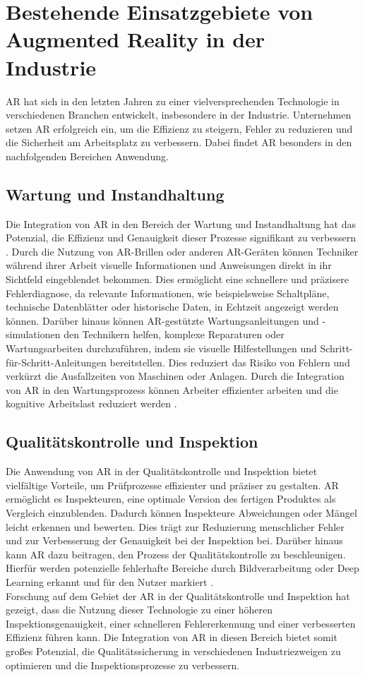 \section{Bestehende Einsatzgebiete von Augmented Reality in der Industrie}

AR hat sich in den letzten Jahren zu einer vielversprechenden Technologie in
verschiedenen Branchen entwickelt, insbesondere in der Industrie. Unternehmen
setzen AR erfolgreich ein, um die Effizienz zu steigern, Fehler zu reduzieren
und die Sicherheit am Arbeitsplatz zu verbessern. Dabei findet AR besonders in
den nachfolgenden Bereichen Anwendung.

\subsection{Wartung und Instandhaltung}
Die Integration von AR in den Bereich der Wartung und Instandhaltung hat das
Potenzial, die Effizienz und Genauigkeit dieser Prozesse signifikant zu
verbessern \cite{liu2022probing}. Durch die Nutzung von AR-Brillen oder anderen
AR-Geräten können Techniker während ihrer Arbeit visuelle Informationen und
Anweisungen direkt in ihr Sichtfeld eingeblendet bekommen. Dies ermöglicht eine
schnellere und präzisere Fehlerdiagnose, da relevante Informationen, wie
beispielsweise Schaltpläne, technische Datenblätter oder historische Daten, in
Echtzeit angezeigt werden können. Darüber hinaus können AR-gestützte
Wartungsanleitungen und -simulationen den Technikern helfen, komplexe
Reparaturen oder Wartungsarbeiten durchzuführen, indem sie visuelle
Hilfestellungen und Schritt-für-Schritt-Anleitungen bereitstellen.
\cite{4079262} Dies reduziert das Risiko von Fehlern und verkürzt die
Ausfallzeiten von Maschinen oder Anlagen. Durch die Integration von AR in den
Wartungsprozess können Arbeiter effizienter arbeiten und die kognitive
Arbeitslast reduziert werden \cite{5620905}.

\subsection{Qualitätskontrolle und Inspektion}
Die Anwendung von AR in der Qualitätskontrolle und Inspektion bietet
vielfältige Vorteile, um Prüfprozesse effizienter und präziser zu gestalten. AR
ermöglicht es Inspekteuren, eine optimale Version des fertigen Produktes als
Vergleich einzublenden. Dadurch können Inspekteure Abweichungen oder Mängel
leicht erkennen und bewerten. Dies trägt zur Reduzierung menschlicher Fehler
und zur Verbesserung der Genauigkeit bei der Inspektion bei. Darüber hinaus
kann AR dazu beitragen, den Prozess der Qualitätskontrolle zu beschleunigen.
Hierfür werden potenzielle fehlerhafte Bereiche durch Bildverarbeitung oder
Deep Learning erkannt und für den Nutzer markiert \cite{9112336}. \\Forschung
auf dem Gebiet der AR in der Qualitätskontrolle und Inspektion hat gezeigt,
dass die Nutzung dieser Technologie zu einer höheren Inspektionsgenauigkeit,
einer schnelleren Fehlererkennung und einer verbesserten Effizienz führen kann.
Die Integration von AR in diesen Bereich bietet somit großes Potenzial, die
Qualitätssicherung in verschiedenen Industriezweigen zu optimieren und die
Inspektionsprozesse zu verbessern.\cite{etonam2019augmented}